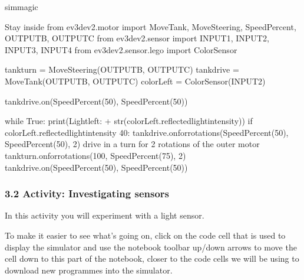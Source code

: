 \documentclass[letterpaper,10pt,english]{sphinxmanual}
\begin{document}
{
\begin{sphinxVerbatim}[commandchars=\\\{\}]
\llap{\color{nbsphinxin}[ ]:\,\hspace{\fboxrule}\hspace{\fboxsep}}\PYGZpc{}\PYGZpc{}sim\PYGZus{}magic

\PYGZsh{} Stay inside
from ev3dev2.motor import MoveTank, MoveSteering, SpeedPercent, OUTPUT\PYGZus{}B, OUTPUT\PYGZus{}C
from ev3dev2.sensor import INPUT\PYGZus{}1, INPUT\PYGZus{}2, INPUT\PYGZus{}3, INPUT\PYGZus{}4
from ev3dev2.sensor.lego import ColorSensor

tank\PYGZus{}turn = MoveSteering(OUTPUT\PYGZus{}B, OUTPUT\PYGZus{}C)
tank\PYGZus{}drive = MoveTank(OUTPUT\PYGZus{}B, OUTPUT\PYGZus{}C)
colorLeft = ColorSensor(INPUT\PYGZus{}2)

tank\PYGZus{}drive.on(SpeedPercent(50), SpeedPercent(50))

while True:
    print(\PYGZsq{}Light\PYGZus{}left: \PYGZsq{} + str(colorLeft.reflected\PYGZus{}light\PYGZus{}intensity))
    if colorLeft.reflected\PYGZus{}light\PYGZus{}intensity \PYGZlt{} 40:
        tank\PYGZus{}drive.on\PYGZus{}for\PYGZus{}rotations(SpeedPercent(\PYGZhy{}50), SpeedPercent(\PYGZhy{}50), 2)
        \PYGZsh{} drive in a turn for 2 rotations of the outer motor
        tank\PYGZus{}turn.on\PYGZus{}for\PYGZus{}rotations(\PYGZhy{}100, SpeedPercent(75), 2)
        tank\PYGZus{}drive.on(SpeedPercent(50), SpeedPercent(50))
\end{sphinxVerbatim}
}


\subsubsection{3.2 Activity: Investigating sensors}
\label{\detokenize{content/00_SOFTWARE_GUIDE/Section_00_03_quick_practical_tour:3.2-Activity:-Investigating-sensors}}
In this activity you will experiment with a light sensor.



To make it easier to see what’s going on, click on the code cell that is used to display the simulator and use the notebook toolbar up/down arrows to move the cell down to this part of the notebook, closer to the code cells we will be using to download new programmes into the simulator.
\end{document}
